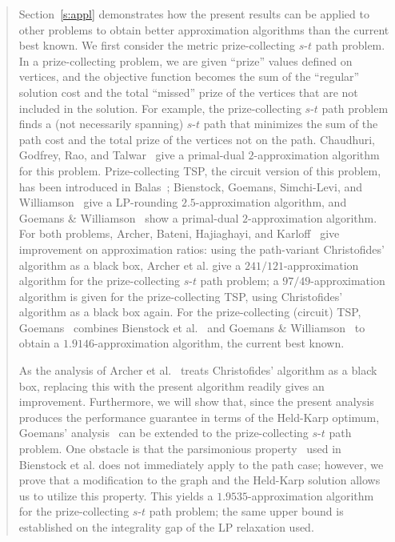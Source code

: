 \documentclass[11pt,letterpaper]{article}
\newcommand{\st}{\mbox{$s$-$t$} }
\begin{document}
\begin{quote}
Section~\ref{s:appl} demonstrates how the present results can be applied to other problems to obtain better approximation algorithms than the current best known. We first consider the metric prize-collecting \st path problem. In a prize-collecting problem, we are given ``prize'' values defined on vertices, and the objective function becomes the sum of the ``regular'' solution cost and the total ``missed'' prize of the vertices that are not included in the solution. For example, the prize-collecting \st path problem finds a (not necessarily spanning) \st path that minimizes the sum of the path cost and the total prize of the vertices not on the path. Chaudhuri, Godfrey, Rao, and Talwar~\cite{CGRT} give a primal-dual $2$-approximation algorithm for this problem. Prize-collecting TSP, the circuit version of this problem, has been introduced in Balas~\cite{B}; Bienstock, Goemans, Simchi-Levi, and Williamson~\cite{BGSW} give a LP-rounding $2.5$-approximation algorithm, and Goemans \& Williamson~\cite{GW} show a primal-dual $2$-approximation algorithm. For both problems, Archer, Bateni, Hajiaghayi, and Karloff~\cite{ABHK} give improvement on approximation ratios: using the path-variant Christofides' algorithm as a black box, Archer et al. give a $241/121$-approximation algorithm for the prize-collecting \st path problem; a $97/49$-approximation algorithm is given for the prize-collecting TSP, using Christofides' algorithm as a black box again. For the prize-collecting (circuit) TSP, Goemans~\cite{G:pc} combines Bienstock et al.~\cite{BGSW} and Goemans \& Williamson~\cite{GW} to obtain a $1.9146$-approximation algorithm, the current best known.

As the analysis of Archer et al.~\cite{ABHK} treats Christofides' algorithm as a black box, replacing this with the present algorithm readily gives an improvement. Furthermore, we will show that, since the present analysis produces the performance guarantee in terms of the Held-Karp optimum, Goemans' analysis~\cite{G:pc} can be extended to the prize-collecting \st path problem. One obstacle is that the parsimonious property~\cite{GB} used in Bienstock et al. does not immediately apply to the path case; however, we prove that a modification to the graph and the Held-Karp solution allows us to utilize this property. This yields a $1.9535$-approximation algorithm for the prize-collecting \st path problem; the same upper bound is established on the integrality gap of the LP relaxation used.


\end{quote}
\end{document}
